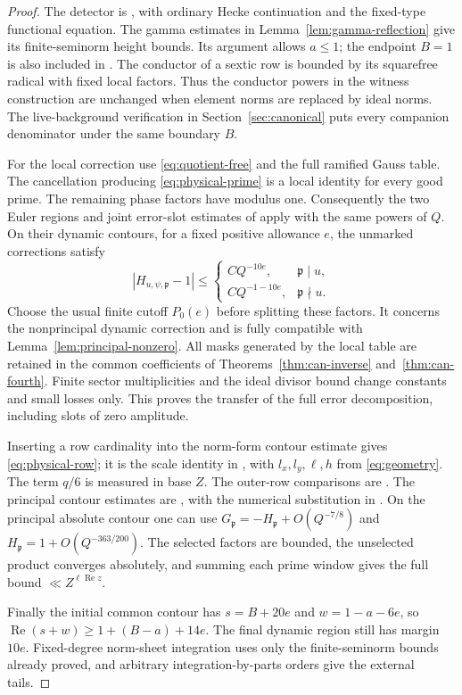 \documentclass[11pt,a4paper]{article}
\numberwithin{equation}{section}
\theoremstyle{definition}
\theoremstyle{remark}
\newcommand{\Rea}{\operatorname{Re}}
\begin{document}
\begin{proof}
The detector is \cite[Section~8]{Q}, with ordinary Hecke continuation and
the fixed-type functional equation.  The gamma estimates in
Lemma~\ref{lem:gamma-reflection} give its finite-seminorm height bounds.
Its argument allows $a\leq1$; the endpoint $B=1$ is also included in
\cite[Lemma~10.5]{Q}.  The conductor of a sextic row is bounded by its
squarefree radical with fixed local factors.  Thus the conductor powers in
the witness construction are unchanged when element norms are replaced
by ideal norms.  The live-background verification in
Section~\ref{sec:canonical} puts every companion denominator under the
same boundary $B$.

For the local correction use \eqref{eq:quotient-free} and the full
ramified Gauss table.
The cancellation producing \eqref{eq:physical-prime} is a local identity
for every good prime.  The remaining phase factors have modulus one.
Consequently the two Euler regions and joint error-slot estimates of
\cite[Section~16]{Q} apply with the same powers of $Q$.  On their dynamic contours,
for a fixed positive allowance $e$, the unmarked corrections satisfy
\[
 |H_{u,\psi,\mathfrak p}-1|\leq
 \begin{cases}
 C Q^{-10e},&\mathfrak p\mid u,\\
 C Q^{-1-10e},&\mathfrak p\nmid u.
 \end{cases}
\]
Choose the usual finite cutoff $P_0(e)$ before splitting these factors.
It concerns the nonprincipal dynamic correction and is fully compatible
with Lemma~\ref{lem:principal-nonzero}.
All masks generated by the local table are retained in the common
coefficients of Theorems~\ref{thm:can-inverse} and~\ref{thm:can-fourth}.
Finite sector multiplicities and the ideal divisor bound change constants
and small losses only.  This proves the transfer of the full error
decomposition, including slots of zero amplitude.

Inserting a row cardinality into the norm-form contour estimate gives
\eqref{eq:physical-row}; it is the scale identity in \cite[equation~(20.4)]{Q},
with $l_x,l_y,\ell,h$ from \eqref{eq:geometry}.  The term $q/6$ is measured in base $Z$.
The outer-row comparisons are \cite[Lemma~10.6, equations~(10.21)--(10.25)]{Q}.  The principal contour estimates are
\cite[Lemma~10.5, equations~(10.17)--(10.19)]{Q}, with the numerical
substitution in \cite[equation~(20.3)]{Q}.
On the principal absolute contour one can use
$G_{\mathfrak p}=-H_{\mathfrak p}+O(Q^{-7/8})$ and
$H_{\mathfrak p}=1+O(Q^{-363/200})$.  The selected factors are bounded,
the unselected product converges absolutely, and summing each prime
window gives the full bound $\ll Z^{\ell\Rea z}$.

Finally the initial common contour has $s=B+20e$ and
$w=1-a-6e$, so
$\Rea(s+w)\geq1+(B-a)+14e$.  The final dynamic region still has margin
$10e$.    Fixed-degree norm-sheet
integration uses only the finite-seminorm bounds already proved, and
arbitrary integration-by-parts orders give the external tails.  
\end{proof}
\end{document}

